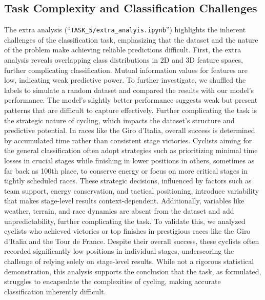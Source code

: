 \subsection{Task Complexity and Classification Challenges}
\label{subsec:extra_analysis}
The extra analysis (\enquote{\texttt{TASK\_5/extra\_analyis.ipynb}}) highlights the inherent challenges of the classification task, emphasizing that the dataset and the nature of the problem make achieving reliable predictions difficult. First, the extra analysis reveals overlapping class distributions in 2D and 3D feature spaces, further complicating classification. Mutual information values for features are low, indicating weak predictive power. To further investigate, we shuffled the labels to simulate a random dataset and compared the results with our model's performance. The model’s slightly better performance suggests weak but present patterns that are difficult to capture effectively.
Further complicating the task is the strategic nature of cycling, which impacts the dataset's structure and predictive potential. In races like the Giro d’Italia, overall success is determined by accumulated time rather than consistent stage victories. Cyclists aiming for the general classification often adopt strategies such as prioritizing minimal time losses in crucial stages while finishing in lower positions in others, sometimes as far back as 100th place, to conserve energy or focus on more critical stages in tightly scheduled races. These strategic decisions, influenced by factors such as team support, energy conservation, and tactical positioning, introduce variability that makes stage-level results context-dependent. Additionally, variables like weather, terrain, and race dynamics are absent from the dataset and add unpredictability, further complicating the task.
To validate this, we analyzed cyclists who achieved victories or top finishes in prestigious races like the Giro d’Italia and the Tour de France. Despite their overall success, these cyclists often recorded significantly low positions in individual stages, underscoring the challenge of relying solely on stage-level results. While not a rigorous statistical demonstration, this analysis supports the conclusion that the task, as formulated, struggles to encapsulate the complexities of cycling, making accurate classification inherently difficult.

